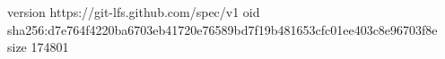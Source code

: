 version https://git-lfs.github.com/spec/v1
oid sha256:d7e764f4220ba6703eb41720e76589bd7f19b481653cfc01ee403c8e96703f8e
size 174801
